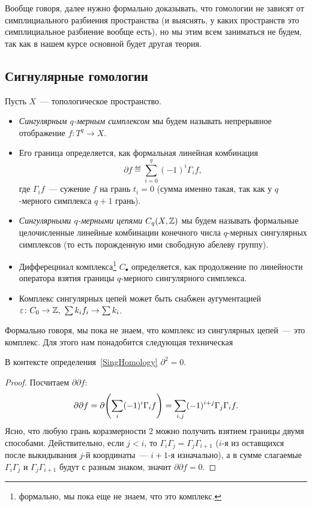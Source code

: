     Вообще говоря, далее нужно формально доказывать, что гомологии не зависят от симплициального разбиения пространства (и выяснять, у каких пространств это симплициальное разбиение вообще есть),
    но мы этим всем заниматься не будем, так как в нашем курсе основной будет другая теория.

    \subsection{Сигнулярные гомологии}

    \begin{definition}\label{SingHomology}
        Пусть $X$~--- топологическое пространство.
        \begin{itemize}
            \item \emph{Сингулярным $q$-мерным симплексом} мы будем называть непрерывное отображение $f\colon T^{q} \to X$.
            \item Его граница определяется, как формальная линейная комбинация
                    \[ \partial f \eqdef \sum_{i = 0}^{q} (-1)^i \Gamma_i f,\]
                    где $\Gamma_i f$~--- сужение $f$ на грань $t_i = 0$ (сумма именно такая, так как у $q$-мерного симплекса $q + 1$ грань).
            \item \emph{Сингулярными $q$-мерными цепями} $C_{q}(X, \mathbb{Z})$ мы будем называть формальные целочисленные линейные комбинации конечного числа $q$-мерных сингулярных симплексов (то есть порожденную ими свободную абелеву группу).
            \item Дифферецниал комплекса\footnote{формально, мы пока еще не знаем, что это комплекс.} $C_{\bullet}$ определяется, как продолжение по линейности оператора взятия границы $q$-мерного сингулярного симплекса.
            \item Комплекс сингулярных цепей может быть снабжен аугументацией $\varepsilon \colon C_{0}\to \mathbb{Z}, \ \sum k_i f_i \to \sum k_i$.
        \end{itemize}
    \end{definition}

    \begin{remark}
       Формально говоря, мы пока не знаем, что комплекс из сингулярных цепей~--- это комплекс. Для этого нам понадобится следующая техническая
    \end{remark}

    \begin{lemma}
        В контексте определения~\ref{SingHomology} $\partial^2 = 0$.
    \end{lemma}
    \begin{proof}
        Посчитаем $\partial \partial f$:
        \[ \partial \partial f = \partial \lr*{\sum_{i} (-1)^i \Gamma_i f} =  \sum_{i, j} (-1)^{i + j} \Gamma_{j}\Gamma_{i}f. \]
        Ясно, что любую грань коразмерности 2 можно получить взятием границы двумя способами.
        Действительно, если $j < i$, то $\Gamma_{i}\Gamma_{j} = \Gamma_{j}\Gamma_{i + 1} $ ($i$-я из оставщихся после выкидывания $j$-й координаты~--- $i+1$-я изначально),
        а в сумме слагаемые $\Gamma_{i}\Gamma_{j}$ и $\Gamma_{j}\Gamma_{i + 1}$ будут с разным знаком, значит $\partial \partial f = 0$.
    \end{proof}


